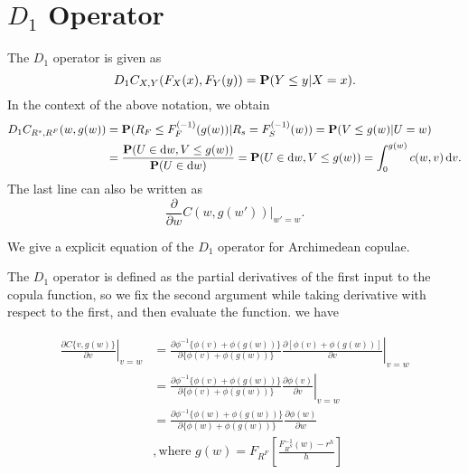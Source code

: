 
\section{$D_1$ Operator}

The $D_1$ operator is given as
\begin{equation*}
    D_1 C_{X,Y}(F_X(x), F_Y(y)) = {\bf P}(Y\leq y|X=x).
\end{equation*}
In the context of the above notation, we obtain
\begin{align*}
  D_1 C_{R^s, R^F}(w, g(w)) &= \p(R_F\leq F_{F}^{(-1)}(g(w))|
  R_s=F_S^{(-1)}(w)) %
  = \p(V\leq g(w)| U=w)\\ %
  &= \frac{\p(U\in \dd w, V\leq g(w))} {\p(U\in \dd w)} %
  = \p(U\in \dd w, V\leq g(w)) %
  = \int_0^{g(w)} c(w,v)\, \dd v. 
\end{align*}
The last line can also be written as
\begin{equation*}
  \frac{\partial }{\partial w} C(w, g(w')) \big|_{w'=w}. 
\end{equation*}



We give a explicit equation of the $D_1$ operator for Archimedean copulae.

The $D_1$ operator is defined as the partial derivatives of the first input to the copula function,
so we fix the second argument while taking derivative with respect to the first, and then evaluate the function.
we have

\begin{align}
\left.\frac{\partial C\{v, g(w)\}}{\partial v} \right\vert_{v=w}
&=
\left.\frac{\partial  \phi^{-1}\{\phi(v)+\phi(g(w))\}}
{\partial  \{\phi(v)+\phi(g(w))\}}
\frac{\partial  [\phi(v)+\phi(g(w))]}
{\partial  v}
\right\vert_{v=w}\\
&=
\left.\frac{\partial   \phi^{-1}\{\phi(v)+\phi(g(w))\}}
{\partial \{\phi(v)+\phi(g(w))\}}
\frac{\partial  \phi(v)}{\partial  v}
\right\vert_{v=w}\\
&=
\frac{\partial \phi^{-1}\{\phi(w)+\phi(g(w))\}}
{\partial \{\phi(w)+\phi(g(w))\}}
\frac{\partial  \phi(w)}{\partial  w}\\
&,
\text{where } g(w) = F_{R^F}\left[\frac{F^{-1}_{R^S}(w)-r^h}{h}\right]\\
\end{align}

